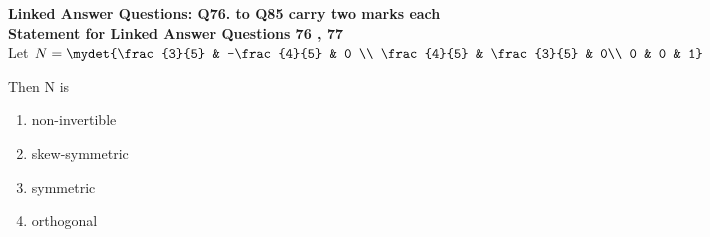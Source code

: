         \textbf{Linked Answer Questions: Q76. to Q85 carry two marks each}\\
\textbf{Statement for Linked Answer Questions 76 , 77}\\
 Let $N = \mydet{\frac{3}{5} & -\frac{4}{5} & 0 \\ \frac{4}{5} & \frac{3}{5} & 0\\ 0 & 0 & 1}$
	\item[76.] Then N is
		\hfill{}
\begin{enumerate}
			\item non-invertible 
			\item skew-symmetric
			\item symmetric
			\item orthogonal
		\end{enumerate}
		
